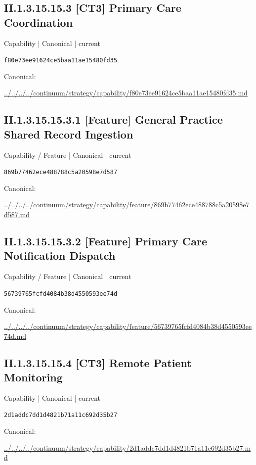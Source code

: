\documentclass[10pt,a4paper]{article}
\begin{document}
\subsection*{II.1.3.15.15.3 [CT3] Primary Care Coordination}
{\small Capability | Canonical | current}\par
\texttt{f80e73ee91624ce5baa11ae15480fd35}\par
Canonical: \par
{\footnotesize\url{../../../../continuum/strategy/capability/f80e73ee91624ce5baa11ae15480fd35.md}}\par
\subsection*{II.1.3.15.15.3.1 [Feature] General Practice Shared Record Ingestion}
{\small Capability / Feature | Canonical | current}\par
\texttt{869b77462ece488788c5a20598e7d587}\par
Canonical: \par
{\footnotesize\url{../../../../continuum/strategy/capability/feature/869b77462ece488788c5a20598e7d587.md}}\par
\subsection*{II.1.3.15.15.3.2 [Feature] Primary Care Notification Dispatch}
{\small Capability / Feature | Canonical | current}\par
\texttt{56739765fcfd4084b38d4550593ee74d}\par
Canonical: \par
{\footnotesize\url{../../../../continuum/strategy/capability/feature/56739765fcfd4084b38d4550593ee74d.md}}\par
\subsection*{II.1.3.15.15.4 [CT3] Remote Patient Monitoring}
{\small Capability | Canonical | current}\par
\texttt{2d1addc7dd1d4821b71a11c692d35b27}\par
Canonical: \par
{\footnotesize\url{../../../../continuum/strategy/capability/2d1addc7dd1d4821b71a11c692d35b27.md}}\par
\end{document}
